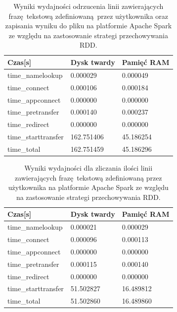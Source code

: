 \begin{table}[]
	\centering
	\caption{Wyniki wydajności odrzucenia linii zawierających frazę tekstową zdefiniowaną przez użytkownika oraz zapisania wyniku do pliku na platformie Apache Spark ze względu na zastosowanie strategi przechowywania RDD.}
	\label{tab:reject-spark-modes-results}
	\begin{tabular}{|l|l|l|}
		\hline
		Czas{[}s{]}         & Dysk twardy & Pamięć RAM \\ \hline
		time\_namelookup    & 0.000029    & 0.000049   \\ \hline
		time\_connect       & 0.000106    & 0.000184   \\ \hline
		time\_appconnect    & 0.000000    & 0.000000   \\ \hline
		time\_pretransfer   & 0.000140    & 0.000237   \\ \hline
		time\_redirect      & 0.000000    & 0.000000   \\ \hline
		time\_starttransfer & 162.751406  & 45.186254  \\ \hline
		time\_total         & 162.751459  & 45.186296  \\ \hline
	\end{tabular}
\end{table}

\begin{table}[]
	\centering
	\caption{Wyniki wydajności dla zliczania ilości linii zawierających frazę tekstową zdefiniowaną przez użytkownika na platformie Apache Spark ze względu na zastosowanie strategi przechowywania RDD.}
	\label{tab:word-occurence-spark-modes-results}
	\begin{tabular}{|l|l|l|}
		\hline
		Czas{[}s{]}         & Dysk twardy & Pamięć RAM \\ \hline
		time\_namelookup    & 0.000021    & 0.000029   \\ \hline
		time\_connect       & 0.000096    & 0.000113   \\ \hline
		time\_appconnect    & 0.000000    & 0.000000   \\ \hline
		time\_pretransfer   & 0.000115    & 0.000140   \\ \hline
		time\_redirect      & 0.000000    & 0.000000   \\ \hline
		time\_starttransfer & 51.502827   & 16.489812 \\ \hline
		time\_total         & 51.502860   & 16.489860 \\ \hline
	\end{tabular}
\end{table}

